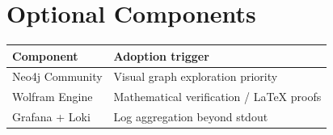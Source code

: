 \section{Optional Components}

\begin{table}[h]
\centering
\begin{tabular}{@{}ll@{}}
\toprule
\textbf{Component} & \textbf{Adoption trigger} \\
\midrule
Neo4j Community    & Visual graph exploration priority \\
Wolfram Engine     & Mathematical verification / LaTeX proofs \\
Grafana + Loki     & Log aggregation beyond stdout \\
\bottomrule
\end{tabular}
\end{table}
